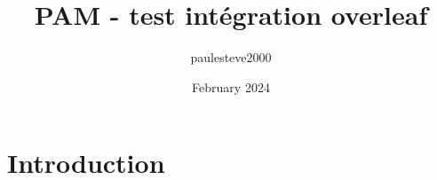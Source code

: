 \documentclass{article}
\title{PAM - test intégration overleaf}
\author{paulesteve2000 }
\date{February 2024}
\begin{document}
\maketitle

\section{Introduction}
\end{document}
